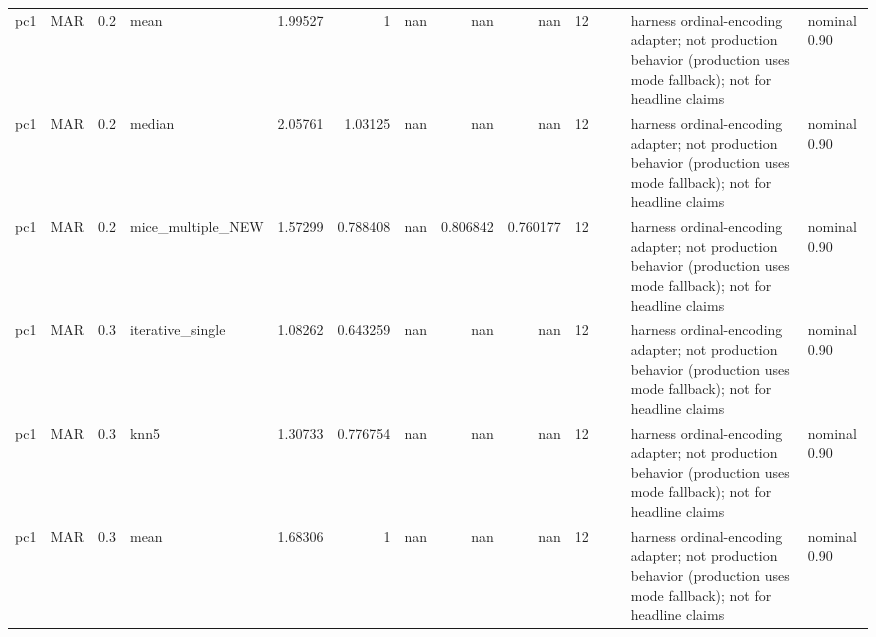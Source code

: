\begin{table}[ht]
\begin{tabular}{llrlrrrrrrllll}
 pc1                  & MAR         &         0.2 & mean              &       1.99527  &             1        &               nan        &                     nan        &                       nan        &        12 &                    &                                         & harness ordinal-encoding adapter; not production behavior (production uses mode fallback); not for headline claims & nominal 0.90              \\
 pc1                  & MAR         &         0.2 & median            &       2.05761  &             1.03125  &               nan        &                     nan        &                       nan        &        12 &                    &                                         & harness ordinal-encoding adapter; not production behavior (production uses mode fallback); not for headline claims & nominal 0.90              \\
 pc1                  & MAR         &         0.2 & mice\_multiple\_NEW &       1.57299  &             0.788408 &               nan        &                       0.806842 &                         0.760177 &        12 &                    &                                         & harness ordinal-encoding adapter; not production behavior (production uses mode fallback); not for headline claims & nominal 0.90              \\
 pc1                  & MAR         &         0.3 & iterative\_single  &       1.08262  &             0.643259 &               nan        &                     nan        &                       nan        &        12 &                    &                                         & harness ordinal-encoding adapter; not production behavior (production uses mode fallback); not for headline claims & nominal 0.90              \\
 pc1                  & MAR         &         0.3 & knn5              &       1.30733  &             0.776754 &               nan        &                     nan        &                       nan        &        12 &                    &                                         & harness ordinal-encoding adapter; not production behavior (production uses mode fallback); not for headline claims & nominal 0.90              \\
 pc1                  & MAR         &         0.3 & mean              &       1.68306  &             1        &               nan        &                     nan        &                       nan        &        12 &                    &                                         & harness ordinal-encoding adapter; not production behavior (production uses mode fallback); not for headline claims & nominal 0.90              \\

\end{tabular}
\end{table}
